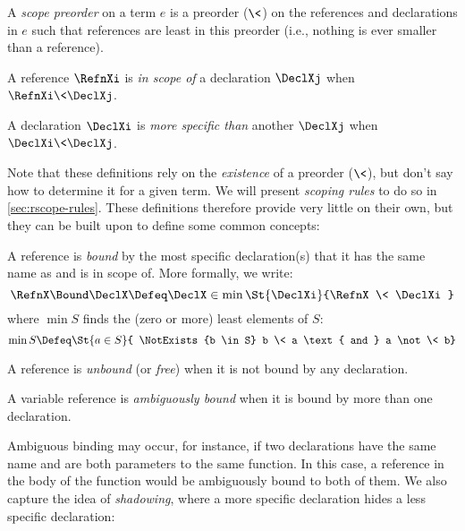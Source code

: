 \begin{definition}[Scope]\label{def:rscope-scope}
  A \emph{scope preorder} on a term $e$ is a preorder ($\<$) on the references
  and declarations in $e$ such that references are least in this
  preorder (i.e., nothing is ever smaller than a reference).
\end{definition}
\begin{definition}
  A reference $\RefnXi$ is \emph{in scope of} a declaration
  $\DeclXj$ when $\RefnXi \< \DeclXj$.
\end{definition}
\begin{definition}
  A declaration $\DeclXi$ is \emph{more specific than}
    another $\DeclXj$ when $\DeclXi \< \DeclXj$.
\end{definition}
Note that these definitions rely on the \emph{existence} of a preorder
($\<$), but don't say how to determine it for a given term. We will present
\emph{scoping rules} to do so in \cref{sec:rscope-rules}.
These definitions therefore provide very little on their own, but they can be built upon to define
some common concepts:

\begin{definition}[Bound]
  \label{def:rscope-bound}
  A reference is \emph{bound} by the most specific declaration(s) that
  it has the same name as and is in scope of. More formally, we write:
  \[ \RefnX \Bound \DeclX \Defeq
  \DeclX \in \min \St{\DeclXi}{\RefnX \< \DeclXi} \]
  where $\min S$ finds the (zero or more) least elements of $S$:
\[ \min S \Defeq \St{a \in S}{
  \NotExists{b \in S}
    b \< a \text{ and } a \not\< b}
\]
\end{definition}

\begin{definition}[Unbound]
A reference is \emph{unbound} (or \emph{free}) when it is not bound by
any declaration.
\end{definition}

\begin{definition}\label{def:rscope-ambig}
  A variable reference is \emph{ambiguously bound} when it is bound by
  more than one declaration.
\end{definition}

Ambiguous binding may occur, for instance, if two declarations
have the same name and are both parameters to the same function.
In this case, a reference in the body of the function would be
ambiguously bound to both of them.
We also capture the idea of \emph{shadowing}, where a more specific
declaration hides a less specific declaration:

